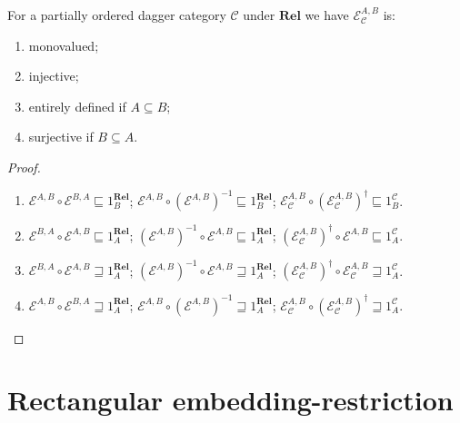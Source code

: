 \begin{prop}
  For a partially ordered dagger category $\mathcal{C}$ under
  $\mathbf{Rel}$ we have $\mathcal{E}_{\mathcal{C}}^{A,B}$ is:
  \begin{enumerate}
    \item monovalued;
    
    \item injective;
    
    \item entirely defined if $A \subseteq B$;
    
    \item surjective if $B \subseteq A$.
  \end{enumerate}
\end{prop}

\begin{proof}
  ~
  \begin{enumerate}
    \item $\mathcal{E}^{A,B} \circ \mathcal{E}^{B,A} \sqsubseteq
    1^{\mathbf{Rel}}_B$; $\mathcal{E}^{A,B} \circ (\mathcal{E}^{A,B})^{- 1} \sqsubseteq 1^{\mathbf{Rel}}_B$;
    $\mathcal{E}_{\mathcal{C}}^{A,B} \circ (\mathcal{E}_{\mathcal{C}}^{A,B})^{\dagger} \sqsubseteq 1^{\mathcal{C}}_B$.
    
    \item $\mathcal{E}^{B,A} \circ \mathcal{E}^{A,B} \sqsubseteq
    1^{\mathbf{Rel}}_A$; $(\mathcal{E}^{A,B})^{- 1} \circ \mathcal{E}^{A,B} \sqsubseteq 1^{\mathbf{Rel}}_A$;
    $(\mathcal{E}_{\mathcal{C}}^{A,B})^{\dagger} \circ \mathcal{E}^{A,B} \sqsubseteq 1^{\mathcal{C}}_A$.
    
    \item $\mathcal{E}^{B,A} \circ \mathcal{E}^{A,B} \sqsupseteq
    1^{\mathbf{Rel}}_A$; $(\mathcal{E}^{A,B})^{- 1} \circ \mathcal{E}^{A,B} \sqsupseteq 1^{\mathbf{Rel}}_A$;
    $(\mathcal{E}_{\mathcal{C}}^{A,B})^{\dagger} \circ \mathcal{E}_{\mathcal{C}}^{A,B} \sqsupseteq 1^{\mathcal{C}}_A$.
    
    \item $\mathcal{E}^{A,B} \circ \mathcal{E}^{B,A} \sqsupseteq
    1^{\mathbf{Rel}}_A$; $\mathcal{E}^{A,B} \circ (\mathcal{E}^{A,B})^{- 1} \sqsupseteq 1^{\mathbf{Rel}}_A$;
    $\mathcal{E}_{\mathcal{C}}^{A,B} \circ (\mathcal{E}_{\mathcal{C}}^{A,B})^{\dagger} \sqsupseteq 1^{\mathcal{C}}_A$.
  \end{enumerate}
\end{proof}

\section{Rectangular embedding-restriction}

